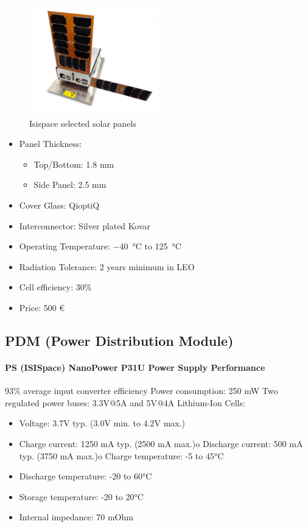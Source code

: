 \begin{figure}[h]
	\centering
	\includegraphics[width=0.5\textwidth]{img/solar_panels.png}
	\caption{Isispace selected solar panels}
	\label{fig:solar_panels}
\end{figure}

\begin{itemize}
	\item Panel Thickness:
	\begin{itemize}
		\item Top/Bottom: 1.8 mm
		\item Side Panel: 2.5 mm
	\end{itemize}
	\item Cover Glass: QioptiQ
	\item Interconnector: Silver plated Kovar
	\item Operating Temperature: \SI{-40}{\degreeCelsius} to \SI{+125}{\degreeCelsius}
	\item Radiation Tolerance: 2 years minimum in LEO
	\item Cell efficiency: 30\%
	\item Price: 500 \euro
\end{itemize}

\subsection{PDM (Power Distribution Module)}

\paragraph{PS (ISISpace) NanoPower P31U Power Supply Performance}

93\% average input converter efficiency
Power consumption: 250 mW
Two regulated power buses: 3.3V@5A and 5V@4A
Lithium-Ion Cells:
\begin{itemize}
	\item Voltage: 3.7V typ. (3.0V min. to 4.2V max.)
	\item Charge current: 1250 mA typ. (2500 mA max.)o Discharge current: 500 mA typ. (3750 mA max.)o Charge temperature: -5 to 45°C
	\item Discharge temperature: -20 to 60°C
	\item Storage temperature: -20 to 20°C
	\item Internal impedance: 70 mOhm
\end{itemize}

